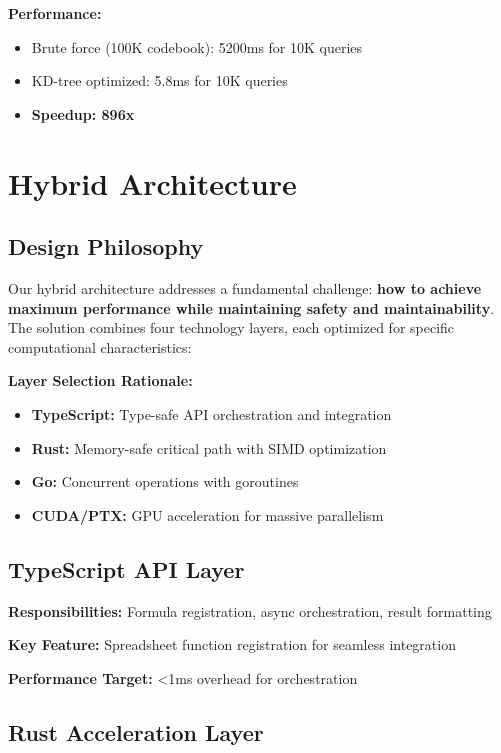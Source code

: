 \documentclass{article}
\begin{document}
\textbf{Performance:}
\begin{itemize}
    \item Brute force (100K codebook): 5200ms for 10K queries
    \item KD-tree optimized: 5.8ms for 10K queries
    \item \textbf{Speedup: 896x}
\end{itemize}

\section{Hybrid Architecture}

\subsection{Design Philosophy}

Our hybrid architecture addresses a fundamental challenge: \textbf{how to achieve maximum performance while maintaining safety and maintainability}. The solution combines four technology layers, each optimized for specific computational characteristics:

\textbf{Layer Selection Rationale:}
\begin{itemize}
    \item \textbf{TypeScript:} Type-safe API orchestration and integration
    \item \textbf{Rust:} Memory-safe critical path with SIMD optimization
    \item \textbf{Go:} Concurrent operations with goroutines
    \item \textbf{CUDA/PTX:} GPU acceleration for massive parallelism
\end{itemize}

\subsection{TypeScript API Layer}

\textbf{Responsibilities:} Formula registration, async orchestration, result formatting

\textbf{Key Feature:} Spreadsheet function registration for seamless integration

\textbf{Performance Target:} <1ms overhead for orchestration

\subsection{Rust Acceleration Layer}
\end{document}
